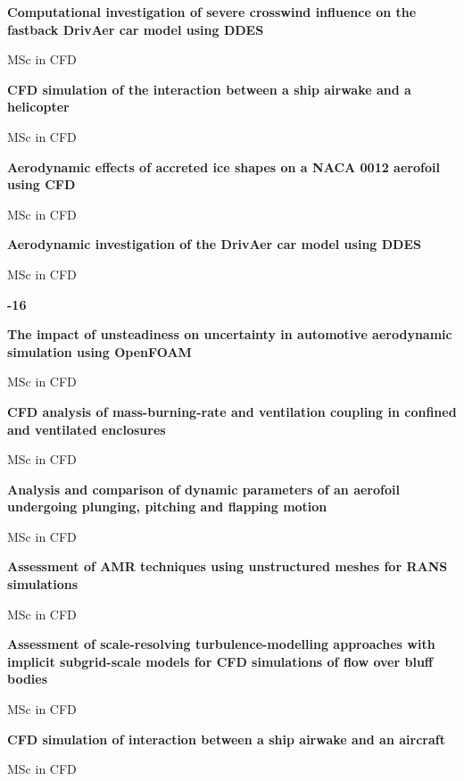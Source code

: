 \documentclass[11pt,a4paper]{article}
\newlength{\cventrysep}
\newenvironment{cventry}{%
  \par\noindent\begin{minipage}{\linewidth}
  \RaggedRight\fontsize{9.8}{12.5}\selectfont
}{\end{minipage}\par\addvspace{\cventrysep}}
\newcommand{\cvtitle}[1]{{\bfseries #1\par}\vspace{1pt}}
\newcommand{\cvmeta}[1]{{\fontsize{9}{11.5}\selectfont\color{Muted}#1\par}\vspace{1pt}}
\newcommand{\cvyear}[1]{{\color{Teal}\bfseries\fontsize{11}{13}\selectfont #1\par}\vspace{6pt}}
\begin{document}
\begin{cventry}
\cvtitle{Computational investigation of severe crosswind influence on the fastback DrivAer car model using DDES}
\cvmeta{MSc in CFD}
\end{cventry}

\begin{cventry}
\cvtitle{CFD simulation of the interaction between a ship airwake and a helicopter}
\cvmeta{MSc in CFD}
\end{cventry}

\begin{cventry}
\cvtitle{Aerodynamic effects of accreted ice shapes on a NACA 0012 aerofoil using CFD}
\cvmeta{MSc in CFD}
\end{cventry}

\begin{cventry}
\cvtitle{Aerodynamic investigation of the DrivAer car model using DDES}
\cvmeta{MSc in CFD}
\end{cventry}

\begin{cventry}
\cvyear{2015-16}
\cvtitle{The impact of unsteadiness on uncertainty in automotive aerodynamic simulation using OpenFOAM}
\cvmeta{MSc in CFD}
\end{cventry}

\begin{cventry}
\cvtitle{CFD analysis of mass-burning-rate and ventilation coupling in confined and ventilated enclosures}
\cvmeta{MSc in CFD}
\end{cventry}

\begin{cventry}
\cvtitle{Analysis and comparison of dynamic parameters of an aerofoil undergoing plunging, pitching and flapping motion}
\cvmeta{MSc in CFD}
\end{cventry}

\begin{cventry}
\cvtitle{Assessment of AMR techniques using unstructured meshes for RANS simulations}
\cvmeta{MSc in CFD}
\end{cventry}

\begin{cventry}
\cvtitle{Assessment of scale-resolving turbulence-modelling approaches with implicit subgrid-scale models for CFD simulations of flow over bluff bodies}
\cvmeta{MSc in CFD}
\end{cventry}

\begin{cventry}
\cvtitle{CFD simulation of interaction between a ship airwake and an aircraft}
\cvmeta{MSc in CFD}
\end{cventry}
\end{document}
